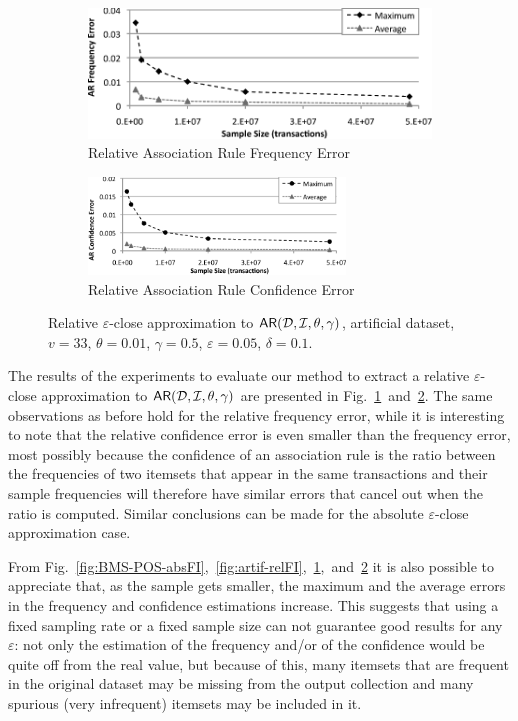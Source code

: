 \begin{figure}[htb]
  \centering
  \begin{subfigure}[b]{\linewidth}
    \centering
    \includegraphics[width=0.75\linewidth]{vcmine/Fig3a}
    \caption{Relative Association Rule Frequency Error}
    \label{fig:artif-relAR-freq}
  \end{subfigure}

  \begin{subfigure}[b]{\linewidth}
    \centering
    \includegraphics[width=0.75\textwidth]{vcmine/Fig3b}
    \caption{Relative Association Rule Confidence Error}
    \label{fig:artif-relAR-conf}  
  \end{subfigure}
  \caption{ Relative $\varepsilon$-close approximation to
  $\mathsf{AR}({\cal D},{\cal I},\theta,\gamma)$, artificial dataset, $v=33$, $\theta=0.01$,
  $\gamma=0.5$, $\varepsilon=0.05$, $\delta=0.1$.} \label{fig:ar}
\end{figure}

The results of the experiments to evaluate our method to extract a relative
$\varepsilon$-close approximation to $\mathsf{AR}({\cal D},{\cal I},\theta,\gamma)$ are presented
in Fig.~\ref{fig:artif-relAR-freq}~and~\ref{fig:artif-relAR-conf}. The same
observations as before hold for the relative
frequency error, while it is interesting to note that the relative confidence
error is even smaller than the frequency error, most possibly because the
confidence of an association rule is the ratio between the frequencies of two
itemsets that appear in the same transactions and their sample frequencies will
therefore have similar errors that cancel out when the ratio is computed.
Similar conclusions can be made for the absolute $\varepsilon$-close
approximation case.

From
Fig.~\ref{fig:BMS-POS-absFI},~\ref{fig:artif-relFI},~\ref{fig:artif-relAR-freq},~and~\ref{fig:artif-relAR-conf}
it is also possible to appreciate that, as the sample gets smaller, the maximum
and the average errors in the frequency and confidence estimations increase.
This suggests that using a fixed sampling rate or a fixed sample size can not
guarantee good results for any $\varepsilon$: not only the estimation of the
frequency and/or of the confidence would be quite off from the real value, but
because of this, many itemsets that are frequent in the original dataset may be
missing from the output collection and many spurious (very infrequent) itemsets
may be included in it.


